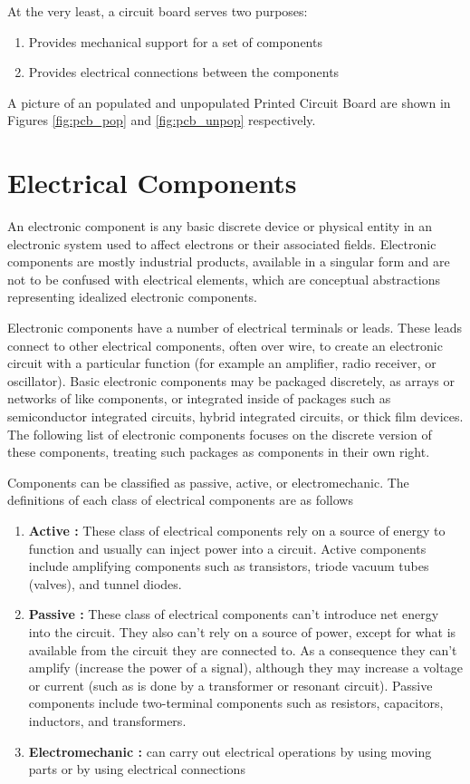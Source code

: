 At the very least, a circuit board serves two purposes:
\begin{enumerate}
\item Provides mechanical support for a set of components
\item Provides electrical connections between the components
\end{enumerate}

A picture of an populated and unpopulated Printed Circuit Board are shown in Figures \ref{fig:pcb_pop} and \ref{fig:pcb_unpop} respectively. 

\section{Electrical Components}

An electronic component is any basic discrete device or physical entity in an electronic system used to affect electrons or their associated fields. Electronic components are mostly industrial products, available in a singular form and are not to be confused with electrical elements, which are conceptual abstractions representing idealized electronic components.

Electronic components have a number of electrical terminals or leads. These leads connect to other electrical components, often over wire, to create an electronic circuit with a particular function (for example an amplifier, radio receiver, or oscillator). Basic electronic components may be packaged discretely, as arrays or networks of like components, or integrated inside of packages such as semiconductor integrated circuits, hybrid integrated circuits, or thick film devices. The following list of electronic components focuses on the discrete version of these components, treating such packages as components in their own right. 

Components can be classified as passive, active, or electromechanic. The definitions of each class of electrical components are as follows
\begin{enumerate}
\item \textbf{Active :} These class of electrical components rely on a source of energy to function and usually can inject power into a circuit. Active components include amplifying components such as transistors, triode vacuum tubes (valves), and tunnel diodes.
\item \textbf{Passive :} These class of electrical components can't introduce net energy into the circuit. They also can't rely on a source of power, except for what is available from the  circuit they are connected to. As a consequence they can't amplify (increase the power of a signal), although they may increase a voltage or current (such as is done by a transformer or resonant circuit). Passive components include two-terminal components such as resistors, capacitors, inductors, and transformers.
\item \textbf{Electromechanic :}  can carry out electrical operations by using moving parts or by using electrical connections
\end{enumerate}

